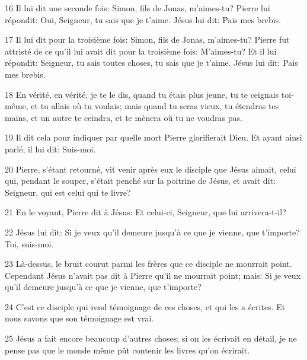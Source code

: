 \par 16 Il lui dit une seconde fois: Simon, fils de Jonas, m'aimes-tu? Pierre lui répondit: Oui, Seigneur, tu sais que je t'aime. Jésus lui dit: Pais mes brebis.
\par 17 Il lui dit pour la troisième fois: Simon, fils de Jonas, m'aimes-tu? Pierre fut attristé de ce qu'il lui avait dit pour la troisième fois: M'aimes-tu? Et il lui répondit: Seigneur, tu sais toutes choses, tu sais que je t'aime. Jésus lui dit: Pais mes brebis.
\par 18 En vérité, en vérité, je te le dis, quand tu étais plus jeune, tu te ceignais toi-même, et tu allais où tu voulais; mais quand tu seras vieux, tu étendras tes mains, et un autre te ceindra, et te mènera où tu ne voudras pas.
\par 19 Il dit cela pour indiquer par quelle mort Pierre glorifierait Dieu. Et ayant ainsi parlé, il lui dit: Suis-moi.
\par 20 Pierre, s'étant retourné, vit venir après eux le disciple que Jésus aimait, celui qui, pendant le souper, s'était penché sur la poitrine de Jésus, et avait dit: Seigneur, qui est celui qui te livre?
\par 21 En le voyant, Pierre dit à Jésus: Et celui-ci, Seigneur, que lui arrivera-t-il?
\par 22 Jésus lui dit: Si je veux qu'il demeure jusqu'à ce que je vienne, que t'importe? Toi, suis-moi.
\par 23 Là-dessus, le bruit courut parmi les frères que ce disciple ne mourrait point. Cependant Jésus n'avait pas dit à Pierre qu'il ne mourrait point; mais: Si je veux qu'il demeure jusqu'à ce que je vienne, que t'importe?
\par 24 C'est ce disciple qui rend témoignage de ces choses, et qui les a écrites. Et nous savons que son témoignage est vrai.
\par 25 Jésus a fait encore beaucoup d'autres choses; si on les écrivait en détail, je ne pense pas que le monde même pût contenir les livres qu'on écrirait.


